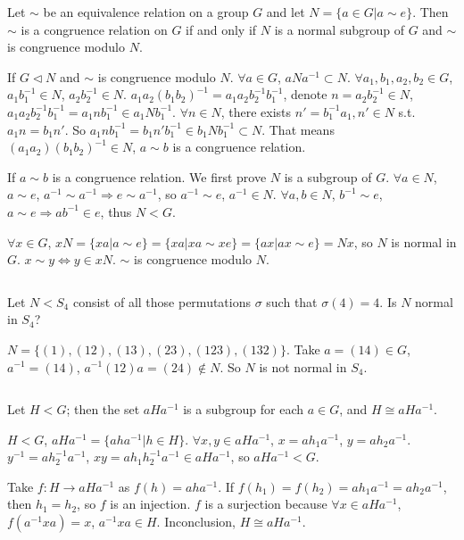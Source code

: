 $$ $$

\begin{ex}
    Let $\sim$ be an equivalence relation on a group $G$ and let $N=\{a\in G |a\sim e\}$. Then $\sim$ is a congruence relation on $G$ if and only if $N$ is a normal subgroup of $G$ and $\sim$ is congruence modulo $N$.
\end{ex}

\begin{answer}
    If $G\lhd N$ and $\sim$ is congruence modulo $N$. $\forall a\in G$, $aNa^{-1}\subset N$. $\forall a_{1}, b_{1}, a_{2}, b_{2}\in G$, $a_{1}b_{1}^{-1}\in N$, $a_{2}b_{2}^{-1}\in N$. $a_{1}a_{2}(b_{1}b_{2})^{-1}=a_{1}a_{2}b_{2}^{-1}b_{1}^{-1}$, denote $n=a_{2}b_{2}^{-1}\in N$, $a_{1}a_{2}b_{2}^{-1}b_{1}^{-1}=a_{1}nb_{1}^{-1}\in a_{1}Nb_{1}^{-1}$. $\forall n\in N$, there exists $n'=b_{1}^{-1}a_{1}, n'\in N$ s.t. $a_{1}n=b_{1}n'$. So $a_{1}nb_{1}^{-1}=b_{1}n'b_{1}^{-1}\in b_{1}Nb_{1}^{-1}\subset N$. That means $(a_{1}a_{2})(b_{1}b_{2})^{-1}\in N$, $a\sim b$ is a congruence relation.

    If $a\sim b$ is a congruence relation. We first prove $N$ is a subgroup of $G$. $\forall a\in N$, $a\sim e$, $a^{-1}\sim a^{-1}\Rightarrow e\sim a^{-1}$, so $a^{-1}\sim e$, $a^{-1}\in N$. $\forall a,b \in N$, $b^{-1}\sim e$, $a\sim e\Rightarrow ab^{-1}\in e$, thus $N<G$.

    $\forall x\in G$, $xN=\{xa|a\sim e\}=\{xa|xa\sim xe\}=\{ax|ax\sim e\}=Nx$, so $N$ is normal in $G$. $x\sim y\Leftrightarrow y\in xN$. $\sim$ is congruence modulo $N$.
\end{answer}

$$ $$

\begin{ex}
    Let $N<S_{4}$ consist of all those permutations $\sigma$ such that $\sigma(4)=4$. Is $N$ normal in $S_{4}$?
\end{ex}

\begin{answer}
    $N=\{(1),(12),(13),(23),(123),(132)\}$. Take $a=(14)\in G$, $a^{-1}=(14)$, $a^{-1}(12)a=(24)\notin N$. So $N$ is not normal in $S_{4}$.
\end{answer}

$$ $$

\begin{ex}
    Let $H<G$; then the set $aHa^{-1}$ is a subgroup for each $a\in G$, and $H\cong aHa^{-1}$. 
\end{ex}

\begin{answer}
    $H<G$, $aHa^{-1}=\{aha^{-1}|h\in H\}$. $\forall x,y\in aHa^{-1}$, $x=ah_{1}a^{-1}$, $y=ah_{2}a^{-1}$. $y^{-1}=ah_{2}^{-1}a^{-1}$, $xy=ah_{1}h_{2}^{-1}a^{-1}\in aHa^{-1}$, so $aHa^{-1}< G$.

     Take $f: H\to aHa^{-1}$ as $f(h)=aha^{-1}$. If $f(h_{1})=f(h_{2})=ah_{1}a^{-1}=ah_{2}a^{-1}$, then $h_{1}=h_{2}$, so $f$ is an injection. $f$ is a surjection because $\forall x\in aHa^{-1}$, $f(a^{-1}xa)=x$, $a^{-1}xa\in H$. Inconclusion, $H\cong aHa^{-1}$.
\end{answer}

